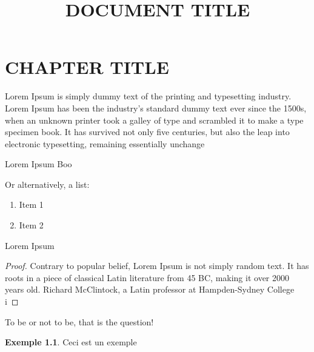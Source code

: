 \documentclass[12pt]{report}
\title{DOCUMENT TITLE}
\theoremstyle{definition}
\newtheorem*{example}{Exemple}
\begin{document}
\chapter{CHAPTER TITLE}
    Lorem Ipsum is simply dummy text of the printing and typesetting industry. 
    Lorem Ipsum has been the industry's standard dummy text ever since the 1500s, 
    when an unknown printer took a galley of type and scrambled it to make a type specimen book. It has survived not only five centuries, but also the leap into electronic typesetting, remaining essentially unchange
    
    \begin{defi}
        \label{def:DEFINITION}
        Lorem Ipsum Boo
    \end{defi}

    Or alternatively, a list:
    \begin{enumerate}
        \setlength{\itemsep}{0pt}
        \item Item 1
        \item Item 2
    \end{enumerate}
    \pagebreak
    \begin{prop}
        \label{thm:THEOREM}
        Lorem Ipsum
    \end{prop}
    \begin{proof}
        Contrary to popular belief, Lorem Ipsum is not simply random text. 
        It has roots in a piece of classical Latin literature from 45 BC, 
        making it over 2000 years old. Richard McClintock, a Latin professor at Hampden-Sydney College i
    \end{proof}

    \begin{attention}
        To be or not to be, that is the question!
    \end{attention}


    \begin{example}
        Ceci est un exemple
    \end{example}
\end{document}
